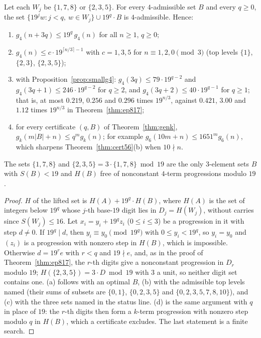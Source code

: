 \begin{proposition}[lifting]\label{prop:lift}
Let each $W_j$ be $\{1,7,8\}$ or $\{2,3,5\}$. For every $4$-admissible set $B$ and every $q\ge0$, the set $\{19^jw:j<q,\ w\in W_j\}\cup19^q\cdot B$ is $4$-admissible. Hence:
\begin{enumerate}[label=(\alph*)]
\item $g_4(n+3q)\le19^q\,g_4(n)$ for all $n\ge1$, $q\ge0$;
\item $g_4(n)\le c\cdot19^{\lceil n/3\rceil-1}$ with $c=1,3,5$ for $n\equiv1,2,0\pmod3$ (top levels $\{1\}$, $\{2,3\}$, $\{2,3,5\}$);
\item with Proposition~\ref{prop:smallg4}: $g_4(3q)\le79\cdot19^{q-2}$ and $g_4(3q+1)\le246\cdot19^{q-2}$ for $q\ge2$, and $g_4(3q+2)\le40\cdot19^{q-1}$ for $q\ge1$; that is, at most $0.219$, $0.256$ and $0.296$ times $19^{n/3}$, against $0.421$, $3.00$ and $1.12$ times $19^{n/3}$ in Theorem~\ref{thm:ep817};
\item for every certificate $(q,B)$ of Theorem~\ref{thm:genk}, $g_k(m|B|+n)\le q^m g_k(n)$; for example $g_6(10m+n)\le1651^m g_6(n)$, which sharpens Theorem~\ref{thm:cert56}(b) when $10\nmid n$.
\end{enumerate}
The sets $\{1,7,8\}$ and $\{2,3,5\}=3\cdot\{1,7,8\}\bmod 19$ are the only $3$-element sets $B$ with $S(B)<19$ and $H(B)$ free of nonconstant $4$-term progressions modulo $19$.
\end{proposition}
\begin{proof}
$H$ of the lifted set is $H(A)+19^q\cdot H(B)$, where $H(A)$ is the set of integers below $19^q$ whose $j$-th base-$19$ digit lies in $D_j=H(W_j)$, without carries since $S(W_j)\le16$. Let $x_i=y_i+19^qz_i$ ($0\le i\le3$) be a progression in it with step $d\ne0$. If $19^q\mid d$, then $y_i\equiv y_0\pmod{19^q}$ with $0\le y_i<19^q$, so $y_i=y_0$ and $(z_i)$ is a progression with nonzero step in $H(B)$, which is impossible. Otherwise $d=19^re$ with $r<q$ and $19\nmid e$, and, as in the proof of Theorem~\ref{thm:ep817}, the $r$-th digits give a nonconstant progression in $D_r$ modulo $19$; $H(\{2,3,5\})=3\cdot D\bmod19$ with $3$ a unit, so neither digit set contains one. (a) follows with an optimal $B$, (b) with the admissible top levels named (their sums of subsets are $\{0,1\}$, $\{0,2,3,5\}$ and $\{0,2,3,5,7,8,10\}$), and (c) with the three sets named in the status line. (d) is the same argument with $q$ in place of $19$: the $r$-th digits then form a $k$-term progression with nonzero step modulo $q$ in $H(B)$, which a certificate excludes. The last statement is a finite search.
\end{proof}

